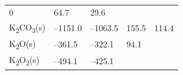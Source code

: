 \documentclass[
  9pt,
]{extbook}
\theoremstyle{definition}
\theoremstyle{definition}
\theoremstyle{definition}
\theoremstyle{remark}
\begin{document}
\begin{longtable}[]{@{}lllll@{}}
\begin{minipage}[t]{0.20\columnwidth}
0\strut
\end{minipage} & \begin{minipage}[t]{0.18\columnwidth}\raggedright
64.7\strut
\end{minipage} & \begin{minipage}[t]{0.18\columnwidth}\raggedright
29.6\strut
\end{minipage}\tabularnewline
\begin{minipage}[t]{0.10\columnwidth}\raggedright
K\textsubscript{2}CO\textsubscript{3}(s)\strut
\end{minipage} & \begin{minipage}[t]{0.19\columnwidth}\raggedright
--1151.0\strut
\end{minipage} & \begin{minipage}[t]{0.20\columnwidth}\raggedright
--1063.5\strut
\end{minipage} & \begin{minipage}[t]{0.18\columnwidth}\raggedright
155.5\strut
\end{minipage} & \begin{minipage}[t]{0.18\columnwidth}\raggedright
114.4\strut
\end{minipage}\tabularnewline
\begin{minipage}[t]{0.10\columnwidth}\raggedright
K\textsubscript{2}O(s)\strut
\end{minipage} & \begin{minipage}[t]{0.19\columnwidth}\raggedright
--361.5\strut
\end{minipage} & \begin{minipage}[t]{0.20\columnwidth}\raggedright
--322.1\strut
\end{minipage} & \begin{minipage}[t]{0.18\columnwidth}\raggedright
94.1\strut
\end{minipage} & \begin{minipage}[t]{0.18\columnwidth}\raggedright
\strut
\end{minipage}\tabularnewline
\begin{minipage}[t]{0.10\columnwidth}\raggedright
K\textsubscript{2}O\textsubscript{2}(s)\strut
\end{minipage} & \begin{minipage}[t]{0.19\columnwidth}\raggedright
--494.1\strut
\end{minipage} & \begin{minipage}[t]{0.20\columnwidth}\raggedright
--425.1\strut
\end{minipage} & \begin{minipage}[t]{0.18\columnwidth}\raggedright

\end{minipage}
\end{longtable}
\end{document}
